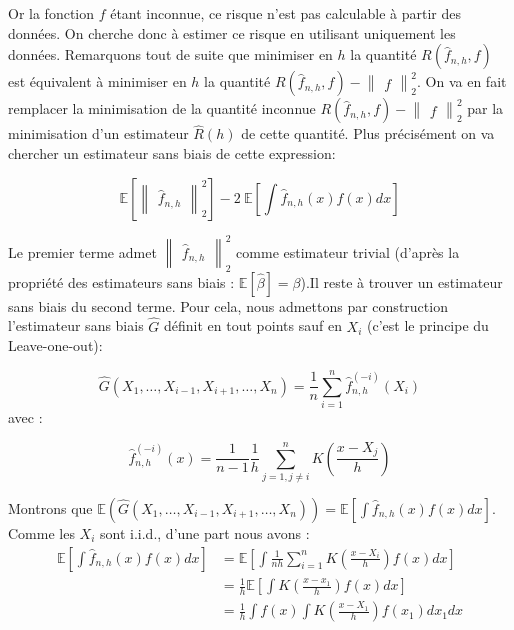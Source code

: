 \documentclass[
]{article}
\begin{document}
Or la fonction \(f\) étant inconnue, ce risque n'est pas calculable à
partir des données. On cherche donc à estimer ce risque en utilisant
uniquement les données. Remarquons tout de suite que minimiser en \(h\)
la quantité \(R(\hat {f}_{n,h}, f)\) est équivalent à minimiser en \(h\)
la quantité \(R(\hat {f}_{n,h}, f)-\begin{Vmatrix}f\end{Vmatrix}_2^2\).
On va en fait remplacer la minimisation de la quantité inconnue
\(R(\hat {f}_{n,h}, f)-\begin{Vmatrix}f\end{Vmatrix}_2^2\) par la
minimisation d'un estimateur \(\hat {R}(h)\) de cette quantité. Plus
précisément on va chercher un estimateur sans biais de cette expression:

\[
\mathbb{E}[\begin{Vmatrix}\hat {f}_{n,h}\end{Vmatrix}_2^2] -2~\mathbb{E}[\int \hat {f}_{n,h}(x)f(x)dx]
\]

Le premier terme admet
\(\begin{Vmatrix}\hat {f}_{n,h}\end{Vmatrix}_2^2\) comme estimateur
trivial (d'après la propriété des estimateurs sans biais :
\(\mathbb{E}[\hat {\beta}]=\beta\)).\newline Il reste à trouver un
estimateur sans biais du second terme. Pour cela, nous admettons par
construction l'estimateur sans biais \(\hat {G}\) définit en tout points
sauf en \(X_i\) (c'est le principe du Leave-one-out):

\[
\hat{G}(X_1,\dots,X_{i-1},X_{i+1},\dots,X_n) = \frac{1}{n}\sum_{i=1}^n\hat {f}_{n,h}^{(-i)}(X_i)
\] avec :

\[
  \hat {f}_{n,h}^{(-i)}(x)= \frac{1}{n-1}\frac{1}{h}\sum_{j=1,j\ne i}^nK(\frac{x-X_j}{h})
\]

Montrons que
\(\mathbb{E}(\hat{G}(X_1,\dots,X_{i-1},X_{i+1},\dots,X_n))=\mathbb{E}[\int \hat{f}_{n,h}(x)f(x)dx]\).\newline
Comme les \(X_i\) sont i.i.d., d'une part nous avons : \[
\begin{aligned}
\mathbb{E}[\int \hat {f}_{n,h}(x)f(x)dx]&= \mathbb{E}[\int \frac {1}{nh}\sum_{i=1}^nK(\frac {x-X_i}{h})f(x)dx]\\
&=\frac{1}{h}\mathbb{E}[\int K(\frac {x-x_1}{h})f(x)dx] \\
&=\frac{1}{h}\int f(x)\int K(\frac {x-X_1}{h})f(x_1)dx_1dx
\end{aligned}
\]
\end{document}
